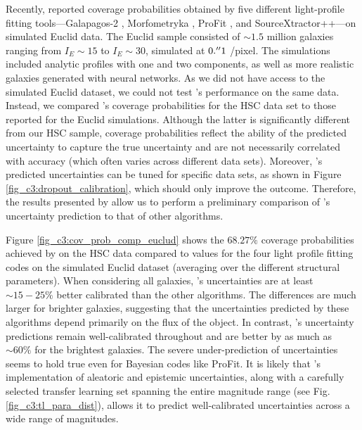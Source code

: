 Recently, \citet{euclid_morph} reported coverage probabilities obtained by five different light-profile fitting tools---Galapagos-2 \citep{galapagos}, Morfometryka \citep{morfometryka}, ProFit \citep{profit}, and SourceXtractor++\citep{srcx++}---on simulated Euclid data. The Euclid sample consisted of $\sim1.5$ million galaxies ranging from $I_E\sim15$ to $I_E\sim30$, simulated at $0.\mbox{$^{\prime\prime}$}1$ /pixel. The simulations included analytic \sersic{} profiles with one and two components, as well as more realistic galaxies generated with neural networks. 
As we did not have access to the simulated Euclid dataset, we could not test \gampen{}'s performance on the same data. 
Instead, we compared \gampen{}'s coverage probabilities for the HSC data set to those reported for the Euclid simulations. 
Although the %
latter is significantly different from our HSC sample, coverage probabilities reflect the ability of the predicted uncertainty to capture the true uncertainty and are not necessarily correlated with accuracy (which often varies across different data sets). Moreover, \gampen{}'s predicted uncertainties can be tuned for specific data sets, as shown in Figure \ref{fig_c3:dropout_calibration}, which should only improve the \gampen{} outcome. Therefore, the results presented by \citet{euclid_morph} allow us to perform a preliminary comparison of \gampen{}'s uncertainty prediction to that of other algorithms.

Figure \ref{fig_c3:cov_prob_comp_euclud} shows the $68.27\%$ coverage probabilities achieved by \gampen{} on the HSC data compared to values for the four light profile fitting codes on the simulated Euclid dataset %
(averaging over the different structural parameters). %
When considering all galaxies, \gampen{}'s uncertainties are at least $\sim15-25\%$ better calibrated than the other algorithms. 
The differences are much larger for brighter galaxies,
suggesting that the uncertainties predicted by these algorithms depend primarily on the flux of the object. In contrast, \gampen{}'s uncertainty predictions remain well-calibrated throughout and are better by as much as $\sim60\%$ for the brightest galaxies. The severe under-prediction of uncertainties seems to hold true even for Bayesian codes like ProFit. 
It is likely that \gampen{}'s implementation of aleatoric and epistemic uncertainties, along with a carefully selected transfer learning set spanning the entire magnitude range (see Fig. \ref{fig_c3:tl_para_dist}), allows it to predict well-calibrated uncertainties across a wide range of magnitudes. 



